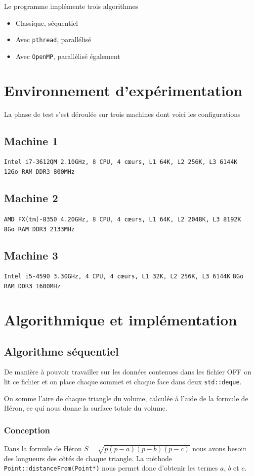 \documentclass[12pt]{article}
\begin{document}
Le programme implémente trois algorithmes
\begin{itemize}
	\item Classique, séquentiel
	\item Avec \texttt{pthread}\cite{pthreads}, parallélisé
	\item Avec \texttt{OpenMP}, parallélisé également
\end{itemize}

\section{Environnement d'expérimentation}
La phase de test s'est déroulée sur trois machines dont voici les configurations

\subsection{Machine 1}
\texttt{Intel i7-3612QM 2.10GHz, 8 CPU, 4 cœurs, L1 64K, L2 256K, L3 6144K}
\texttt{12Go RAM DDR3 800MHz}

\subsection{Machine 2}
\texttt{AMD FX(tm)-8350 4.20GHz, 8 CPU, 4 cœurs, L1 64K, L2 2048K, L3 8192K}
\texttt{8Go RAM DDR3 2133MHz}

\subsection{Machine 3}
\texttt{Intel i5-4590 3.30GHz, 4 CPU, 4 cœurs, L1 32K, L2 256K, L3 6144K}
\texttt{8Go RAM DDR3 1600MHz}

\section{Algorithmique et implémentation}
	\subsection{Algorithme séquentiel}
		De manière à pouvoir travailler sur les données contenues dans les fichier OFF on lit ce fichier et on place chaque sommet et chaque face dans deux \texttt{std::deque}.

		On somme l'aire de chaque triangle du volume, calculée à l'aide de la formule de Héron, ce qui nous donne la surface totale du volume.
		\subsubsection{Conception}
		Dans la formule de Héron $S = \sqrt{p(p-a)(p-b)(p-c)}$ nous avons besoin des longueurs des côtés de chaque triangle. La méthode \texttt{Point::distanceFrom(Point*)} nous permet donc d'obtenir les termes $a$, $b$ et $c$.
\end{document}
